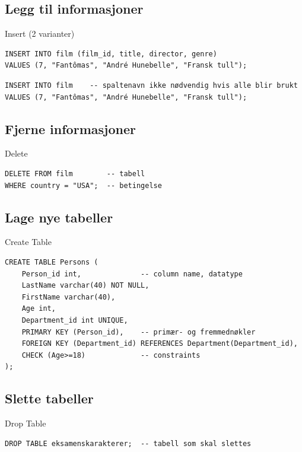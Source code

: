 \subsection*{Legg til informasjoner}
\begin{frame}[fragile]{Insert (2 varianter)}
\begin{verbatim}
INSERT INTO film (film_id, title, director, genre)
VALUES (7, "Fantômas", "André Hunebelle", "Fransk tull"); 
\end{verbatim}

\begin{verbatim}
INSERT INTO film    -- spaltenavn ikke nødvendig hvis alle blir brukt
VALUES (7, "Fantômas", "André Hunebelle", "Fransk tull"); 
\end{verbatim}
\end{frame}

\subsection*{Fjerne informasjoner}
\begin{frame}[fragile]{Delete}
\begin{verbatim}
DELETE FROM film        -- tabell
WHERE country = "USA";  -- betingelse
\end{verbatim}
\end{frame}

\subsection*{Lage nye tabeller}
\begin{frame}[fragile]{Create Table}
\begin{verbatim}
CREATE TABLE Persons (
    Person_id int,              -- column name, datatype
    LastName varchar(40) NOT NULL,
    FirstName varchar(40),
    Age int,
    Department_id int UNIQUE,
    PRIMARY KEY (Person_id),    -- primær- og fremmednøkler
    FOREIGN KEY (Department_id) REFERENCES Department(Department_id),
    CHECK (Age>=18)             -- constraints
);
\end{verbatim}
\end{frame}

\subsection*{Slette tabeller}
\begin{frame}[fragile]{Drop Table}
\begin{verbatim}
DROP TABLE eksamenskarakterer;  -- tabell som skal slettes 
\end{verbatim}
\end{frame}

